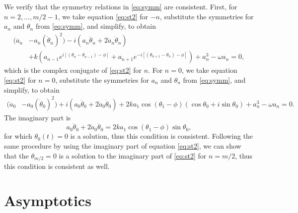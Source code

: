 \documentclass[11pt,reqno]{amsart}
\begin{document}
We verify that the symmetry relations in \cref{eq:symm} are consistent. First, for $n = 2, \dots, m/2-1$, we take equation \cref{eq:st2} for $-n$, substitute the symmetries for $a_n$ and $\theta_n$ from \cref{eq:symm}, and simplify, to obtain 
\begin{equation*}
\begin{aligned}
(\ddot a_n &- a_n (\dot \theta_n)^2) 
- i ( a_n \ddot\theta_n + 2 \dot a_n \dot \theta_n )\\
&+ k\left(a_{n-1}e^{i[(\theta_n - \theta_{n-1}) - \phi]} + a_{n+1}e^{-i[(\theta_{n+1} - \theta_{n}) - \phi]} \right)+a_n^3 - \omega a_n = 0,
\end{aligned}
\end{equation*}	
which is the complex conjugate of \cref{eq:st2} for $n$. For $n = 0$, we take equation \cref{eq:st2} for $n=0$, substitute the symmetries for $a_n$ and $\theta_n$ from \cref{eq:symm}, and simplify, to obtain 
\begin{equation*}
\begin{aligned}
(\ddot a_0 &- a_0 (\dot \theta_0)^2) 
+ i ( a_0 \ddot\theta_0 + 2 \dot a_0 \dot \theta_0 )
+ 2 k a_1 \cos(\theta_1 - \phi)(\cos \theta_0 + i \sin \theta_0) + a_n^3 - \omega a_n = 0.
\end{aligned}
\end{equation*}
The imaginary part is
\begin{equation}\label{eq:n0imagpart}
a_0 \ddot\theta_0 + 2 \dot a_0 \dot \theta_0 = 2 k a_1 \cos(\theta_1 - \phi) \sin \theta_0,
\end{equation}
for which $\theta_0(t) = 0$ is a solution, thus this condition is consistent. Following the same procedure by using the imaginary part of equation \cref{eq:st2}, we can show that the $\theta_{m/2} = 0$ is a solution to the imaginary part of \cref{eq:st2} for $n=m/2$, thus this condition is consistent as well.

\section{Asymptotics}\label{app:asymp}
\end{document}
